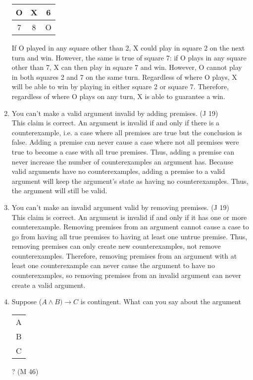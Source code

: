 \documentclass{article}
\begin{document}
\begin{enumerate}
\begin{center}
\begin{tabular}{c|c|c}
                        \hline
                        O & X & 6 \\
                        \hline
                        7 & 8 & O
                  \end{tabular}
            \end{center}
            If O played in any square other than 2, X could play in square 2 on the next turn and win. However, the same is true of square 7: if O plays in any square other than 7, X can then play in square 7 and win.
            However, O cannot play in both squares 2 and 7 on the same turn. Regardless of where O plays, X will be able to win by playing in either square 2 or square 7. Therefore, regardless of where O plays on any turn, X is able to guarantee a win. 
      \item You can't make a valid argument invalid by adding premises. (J 19)\\
            This claim is correct. An argument is invalid if and only if there is a counterexample, i.e. a case where all premises are true but the conclusion is false. Adding a premise can never cause a case where not all premises were true to become a case with all true premises. Thus, adding a premise can never increase the number of counterexamples an argument has. Because valid arguments have no counterexamples, adding a premise to a valid argument will keep the argument's state as having no counterexamples. Thus, the argument will still be valid.
      \item You can't make an invalid argument valid by removing premises. (J 19)\\
            This claim is correct. An argument is invalid if and only if it has one or more counterexample. Removing premises from an argument cannot cause a case to go from having all true premises to having at least one untrue premise. Thus, removing premises can only create new counterexamples, not remove counterexamples. Therefore, removing premises from an argument with at least one counterexample can never cause the argument to have no counterexamples, so removing premises from an invalid argument can never create a valid argument.
      \item Suppose ($A \land B) \to C$ is contingent. What can you say about the argument \begin{tabular}{c}A\\B\\\hline C\end{tabular}? (M 46)\\

\end{enumerate}
\end{document}

